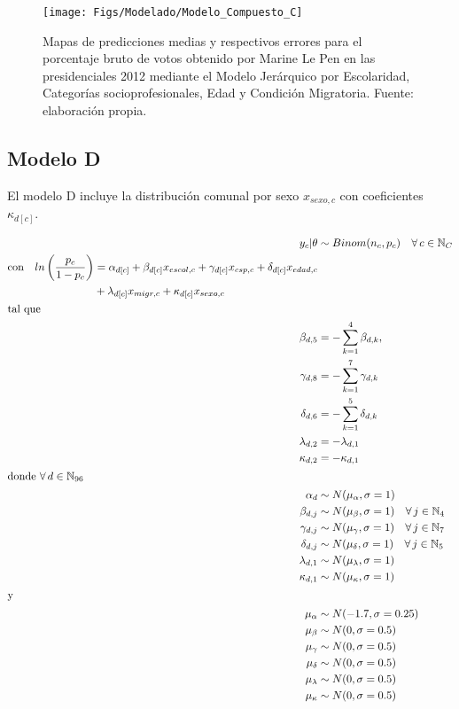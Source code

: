 \begin{figure}[h]
	\centering
	\texttt{[image: Figs/Modelado/Modelo\_Compuesto\_C]}
	\caption{Mapas de predicciones medias y respectivos errores para el porcentaje bruto de votos obtenido por Marine Le Pen en las presidenciales 2012 mediante el Modelo Jerárquico por Escolaridad, Categorías socioprofesionales, Edad y Condición Migratoria. Fuente: elaboración propia.}
	\label{fig:Modelo_Compuesto_C}
\end{figure}

\subsection*{Modelo D}

El modelo D incluye la distribución comunal por sexo $x_{sexo,c}$ con coeficientes $\kappa_{d[c]}$. 

\begin{align}\label{eq:Modelo_Comp_D}
y_c|\theta & \sim Binom(n_c,p_c) \quad \forall \, c \in \mathbb{N}_C \nonumber \\
\begin{split}
\text{con} \quad ln\left(\dfrac{p_c}{1-p_c}\right) &= \alpha_{d[c]} + \beta_{d[c]} x_{escol,c} + \gamma_{d[c]} x_{csp,c} + \delta_{d[c]} x_{edad,c} \\
&+ \lambda_{d[c]} x_{migr,c} + \kappa_{d[c]} x_{sexo,c} 
\end{split}\\
\intertext{tal que} 
\beta_{d,5} &= -\sum\limits_{k = 1}^{4} \beta_{d,k}, \nonumber \\
\gamma_{d,8} &= -\sum\limits_{k = 1}^{7} \gamma_{d,k} \nonumber \\
\delta_{d,6} &= -\sum\limits_{k = 1}^{5} \delta_{d,k} \nonumber \\
\lambda_{d,2} &= -\lambda_{d,1} \nonumber \\
\kappa_{d,2} &= -\kappa_{d,1} \nonumber \\
\intertext{donde $\forall \, d \in \mathbb{N}_{96}$}
\alpha_d & \sim N(\mu_{\alpha}, \sigma=1) \quad  \nonumber \\
\beta_{d,j} & \sim N(\mu_{\beta}, \sigma=1) \quad \forall \, j \in \mathbb{N}_{4} \nonumber \\
\gamma_{d,j} & \sim N(\mu_{\gamma}, \sigma=1) \quad \forall \, j \in \mathbb{N}_{7} \nonumber \\
\delta_{d,j} & \sim N(\mu_{\delta}, \sigma=1) \quad \forall \, j \in \mathbb{N}_{5} \nonumber \\
\lambda_{d,1} & \sim N(\mu_{\lambda}, \sigma=1) \nonumber \\
\kappa_{d,1} & \sim N(\mu_{\kappa}, \sigma=1) \nonumber \\
\intertext{y}
\mu_{\alpha} &\sim N(-1.7,\sigma=0.25) \nonumber \\
\mu_{\beta} &\sim N(0,\sigma=0.5) \nonumber \\
\mu_{\gamma} &\sim N(0,\sigma=0.5) \nonumber \\
\mu_{\delta} &\sim N(0,\sigma=0.5) \nonumber \\
\mu_{\lambda} &\sim N(0,\sigma=0.5) \nonumber \\
\mu_{\kappa} &\sim N(0,\sigma=0.5) \nonumber
\end{align}

